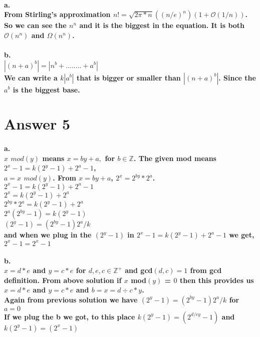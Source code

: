 \documentclass[11pt]{article}
\begin{document}
\paragraph{a.\\ From Stirling's approximation $n! = \sqrt{2\pi*n}((n/e)^n)(1+\mathcal{O}(1/n))$.\\ So we can see the $n^n$ and it is the biggest in the  equation. It is both $\mathcal{O}(n^n)$ and $\Omega(n^n)$. }
\paragraph{b.\\
$|(n+a)^b| = |n^b + ........ + a^b| $ \\ We can write a $k|a^b|$ that is bigger or smaller than $|(n+a)^b|$. Since the $a^b$ is the biggest base. }

\section*{Answer 5}
\paragraph{a.\\ $x$ $mod(y)$ means $x = by + a,$ for $b \in \mathbb{Z}$. The given mod means $2^x - 1 = k( 2^y -1) + 2^a -1$,\\$a = x$ $mod(y)$. From $x = by + a$, $2^x = 2^{by} * 2^a$.\\
$2^x - 1 = k( 2^y -1) + 2^a -1$ \\
$2^x = k( 2^y -1) + 2^a$ \\
$2^{by} * 2^a= k( 2^y -1) + 2^a$ \\ 
$2^a (2^{by}-1) = k( 2^y -1)$\\
$( 2^y -1) = (2^{by}-1) 2^a/k$ \\
and when we plug in the $( 2^y -1)$ in $2^x - 1 = k( 2^y -1) + 2^a -1$ we get, \\
$2^x - 1 = 2^x - 1$}
\paragraph{b.\\
$x = d*e$ and $y = c*e$ for $d,e,c \in \mathbb{Z}^+$ and gcd$(d,c) = 1$ from gcd definition. From above solution if $x$ mod$(y)$ = $0$ then this provides us $x = d*e$ and $y = c*e$ and $ b = x = d\div c *y$.\\
Again from previous solution we have $( 2^y -1) = (2^{by}-1) 2^a/k$ for $a = 0$\\
If we plug the b we got, to this place $k( 2^y -1) = (2^{d/cy}-1)$ and $k( 2^y -1) = (2^x-1)$}
\end{document}

